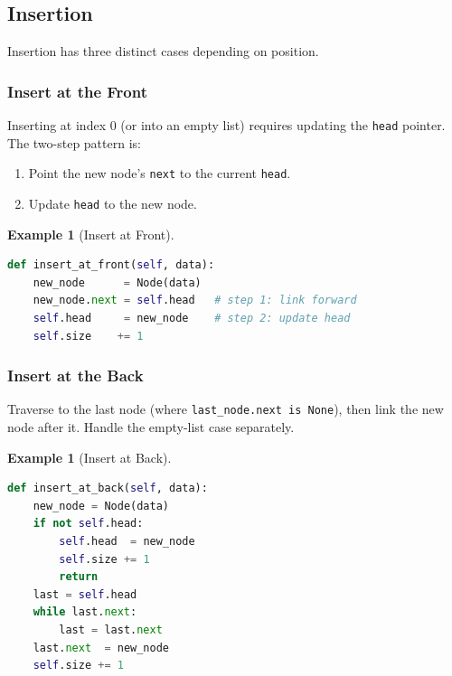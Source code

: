 \documentclass[11pt, a4paper, notitlepage]{report}
\theoremstyle{definition}
\theoremstyle{remark}
\theoremstyle{definition}
\newtheorem{example}[theorem]{Example}
\begin{document}
\subsection{Insertion}
\label{subsec:ll-insert}

Insertion has three distinct cases depending on position.

\subsubsection{Insert at the Front}
\label{subsubsec:insert-front}

Inserting at index 0 (or into an empty list) requires updating the
\texttt{head} pointer. The two-step pattern is:
\begin{enumerate}
  \item Point the new node's \texttt{next} to the current \texttt{head}.
  \item Update \texttt{head} to the new node.
\end{enumerate}

\begin{example}[Insert at Front]
\leavevmode
\begin{lstlisting}[language=Python]
def insert_at_front(self, data):
    new_node      = Node(data)
    new_node.next = self.head   # step 1: link forward
    self.head     = new_node    # step 2: update head
    self.size    += 1
\end{lstlisting}
\end{example}

\subsubsection{Insert at the Back}
\label{subsubsec:insert-back}

Traverse to the last node (where \texttt{last\_node.next is None}), then
link the new node after it. Handle the empty-list case separately.

\begin{example}[Insert at Back]
\leavevmode
\begin{lstlisting}[language=Python]
def insert_at_back(self, data):
    new_node = Node(data)
    if not self.head:
        self.head  = new_node
        self.size += 1
        return
    last = self.head
    while last.next:
        last = last.next
    last.next  = new_node
    self.size += 1
\end{lstlisting}
\end{example}
\end{document}
